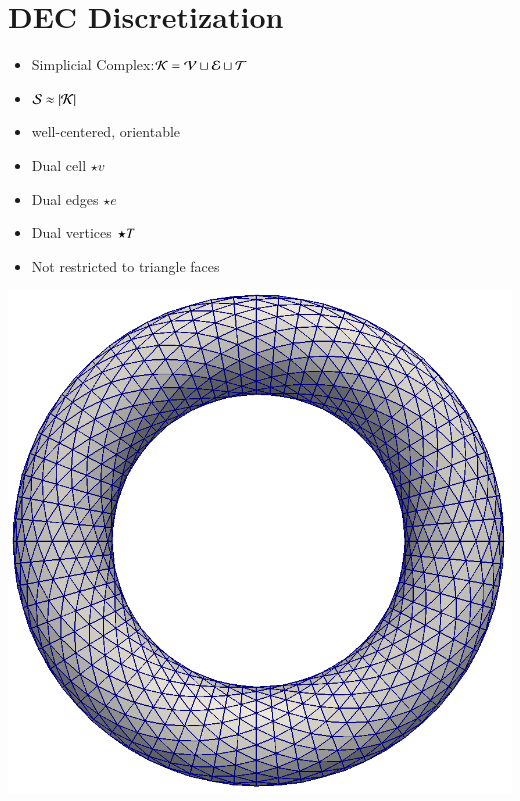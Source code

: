 \documentclass[15pt,t,aspectratio=1610]{beamer}
\begin{document}
  \section{DEC Discretization}
	\begin{frame}
		\tableofcontents[current]
	\end{frame}
  \begin{frame}
    \begin{minipage}{.5\textwidth}
    \begin{itemize}
      \item<1-> Simplicial Complex:\quad \( \mathcal{K}=\mathcal{V}\sqcup\mathcal{E}\sqcup\mathcal{T} \)
      \item<2-> \( \mathcal{S}\approx\left| \mathcal{K} \right| \)
      \item<3-> well-centered, orientable
      \item<4-> Dual cell \( \star v \)
      \item<5-> Dual edges \( \star e \)
      \item<6-> Dual vertices \( \star T \)
      \item<7-> Not restricted to triangle faces
    \end{itemize}
    \end{minipage}
    \hfill
    \begin{minipage}{.49\textwidth}
      \begin{overprint}
         \centering
         \centering\includegraphics[width=\textwidth]{pic/torusgrid.png}
         \centering
         \centering
         \centering
         \centering
         \centering
      \end{overprint}
    \end{minipage}
  \end{frame}
\end{document}
